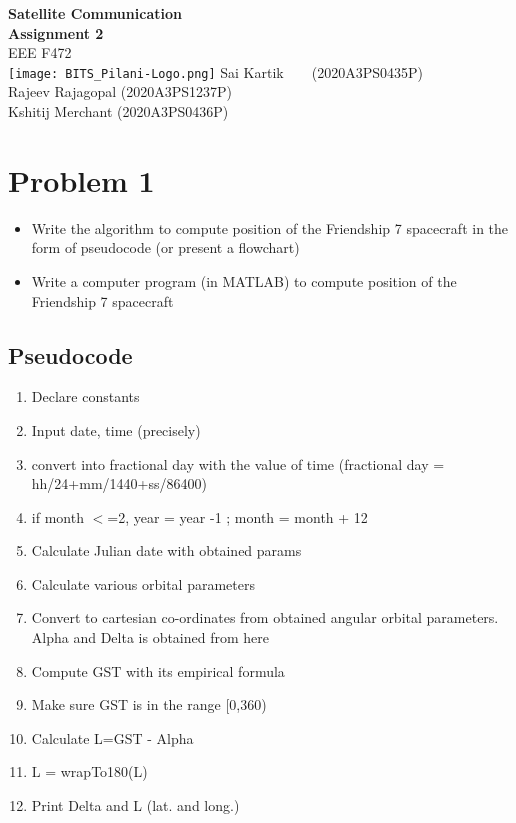 \documentclass[titlepage]{article}
\begin{document}
\begin{titlepage}
    \begin{center}
        \Huge
        \vspace*{3cm}
        \textbf{ \quad Satellite Communication\\ \quad \quad Assignment 2} \\
        \qquad EEE F472\\[5ex]
        \quad\texttt{[image: BITS\_Pilani-Logo.png]}
        \vfill
        \huge
        \qquad Sai Kartik\ \qquad \ \ \ (2020A3PS0435P)\\\qquad Rajeev Rajagopal (2020A3PS1237P) \\ \qquad Kshitij Merchant (2020A3PS0436P)
    \end{center}
\end{titlepage}


\tableofcontents
\listoftables
\newpage
{}
\setcounter{page}{1}

\section {Problem 1}

\begin{tcolorbox}
    \begin{itemize}
        \item Write the algorithm to compute position of the Friendship 7 spacecraft in the form of pseudocode (or present a flowchart)
        \item Write a computer program (in MATLAB) to compute position of the Friendship 7 spacecraft
    \end{itemize}

\end{tcolorbox}
\subsection{Pseudocode}
\begin{enumerate}
    \item Declare constants
    \item Input date, time (precisely)
    \item convert into fractional day with the value of time (fractional day = hh/24+mm/1440+ss/86400)
    \item if month $<$=2, year = year -1 ; month = month + 12
    \item Calculate Julian date with obtained params
    \item Calculate various orbital parameters
    \item Convert to cartesian co-ordinates from obtained angular orbital parameters. Alpha and Delta is obtained from here
    \item Compute GST with its empirical formula
    \item Make sure GST is in the range [0,360)
    \item Calculate L=GST - Alpha
    \item L = wrapTo180(L)
    \item Print Delta and L (lat. and long.)
\end{enumerate}
\end{document}
